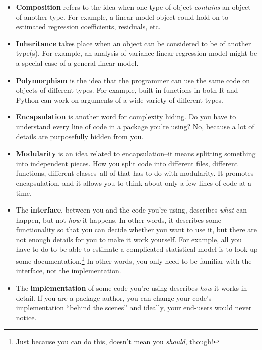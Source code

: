 \documentclass[
  12pt,
  krantz2]{krantz}
\begin{document}
\begin{itemize}
\item
  \textbf{Composition} refers to the idea when one type of object \emph{contains} an object of another type. For example, a linear model object could hold on to estimated regression coefficients, residuals, etc.
\item
  \textbf{Inheritance} takes place when an object can be considered to be of another type(s). For example, an analysis of variance linear regression model might be a special case of a general linear model.
\item
  \textbf{Polymorphism} is the idea that the programmer can use the same code on objects of different types. For example, built-in functions in both R and Python can work on arguments of a wide variety of different types.
\item
  \textbf{Encapsulation} is another word for complexity hiding. Do you have to understand every line of code in a package you're using? No, because a lot of details are purposefully hidden from you.
\item
  \textbf{Modularity} is an idea related to encapsulation--it means splitting something into independent pieces. How you split code into different files, different functions, different classes--all of that has to do with modularity. It promotes encapsulation, and it allows you to think about only a few lines of code at a time.
\item
  The \textbf{interface}, between you and the code you're using, describes \emph{what} can happen, but not \emph{how} it happens. In other words, it describes some functionality so that you can decide whether you want to use it, but there are not enough details for you to make it work yourself. For example, all you have to do to be able to estimate a complicated statistical model is to look up some documentation.\footnote{Just because you can do this, doesn't mean you \emph{should}, though!} In other words, you only need to be familiar with the interface, not the implementation.
\item
  The \textbf{implementation} of some code you're using describes \emph{how} it works in detail. If you are a package author, you can change your code's implementation ``behind the scenes'' and ideally, your end-users would never notice.
\end{itemize}
\end{document}
